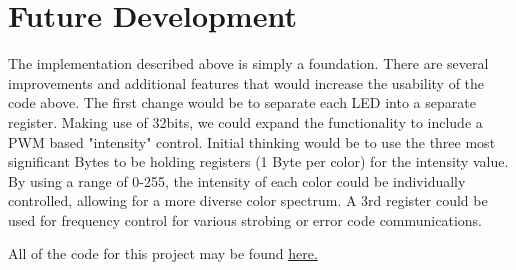 \documentclass{article}
\begin{document}
\section{Future Development}
The implementation described above is simply a foundation. There are several improvements and additional features that would increase the usability of the code above. The first change would be to separate each LED into a separate register. Making use of 32bits, we could expand the functionality to include a PWM based "intensity" control. Initial thinking would be to use the three most significant Bytes to be holding registers (1 Byte per color) for the intensity value. By using a range of 0-255, the intensity of each color could be individually controlled, allowing for a more diverse color spectrum. A 3rd register could be used for frequency control for various strobing or error code communications. 

All of the code for this project may be found \href{https://github.com/jbruntri/Soc_FPGA}{here.}
\end{document}

